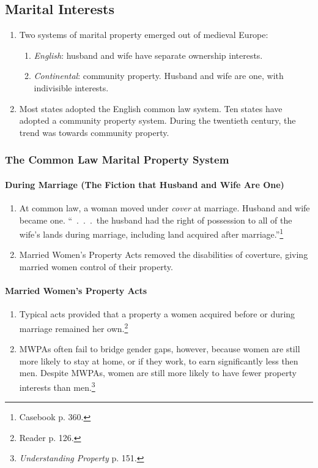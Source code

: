 \subsection{Marital Interests}

\begin{enumerate}
    \item Two systems of marital property emerged out of medieval Europe:
    \begin{enumerate}
        \item \emph{English}: husband and wife have separate ownership 
        interests.
        \item \emph{Continental}: community property. Husband and wife are 
        one, with indivisible interests.
    \end{enumerate}
    \item Most states adopted the English common law system. Ten states 
    have adopted a community property system. During the twentieth century, 
    the trend was towards community property.
\end{enumerate}

\subsubsection{The Common Law Marital Property System}

\paragraph{During Marriage (The Fiction that Husband and Wife Are One)}

\begin{enumerate}
    \item At common law, a woman moved under \emph{cover} at marriage. Husband 
    and wife became one. ``~.~.~.~the husband had the right of possession to 
    all of the wife's lands during marriage, including land acquired after 
    marriage.''\footnote{Casebook p. 360.}
    \item Married Women's Property Acts removed the disabilities of coverture, 
    giving married women control of their property.
\end{enumerate}

\paragraph{Married Women's Property Acts}

\begin{enumerate}
    \item Typical acts provided that a property a women acquired before or 
    during marriage remained her own.\footnote{Reader p. 126.}
    \item MWPAs often fail to bridge gender gaps, however, because women are 
    still more likely to stay at home, or if they work, to earn significantly 
    less then men. Despite MWPAs, women are still more likely to have fewer 
    property interests than men.\footnote{\emph{Understanding Property} p. 
    151.}
\end{enumerate}

